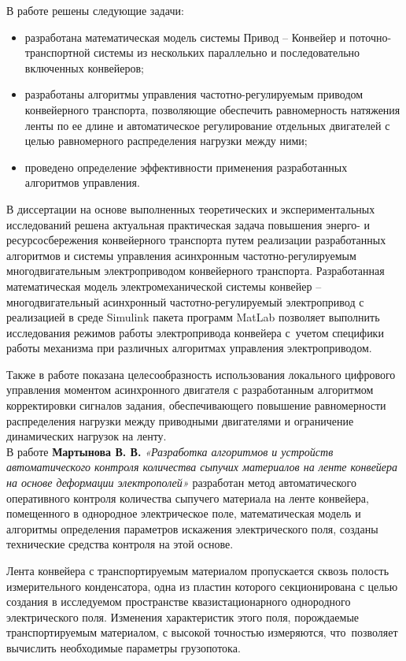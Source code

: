 В работе решены следующие задачи:
\begin{itemize}
\item разработана математическая модель системы Привод – Конвейер  и поточно-транспортной системы из нескольких параллельно и последовательно включенных конвейеров;
\item разработаны алгоритмы управления частотно-регулируемым приводом конвейерного транспорта, позволяющие обеспечить равномерность натяжения ленты по ее длине и автоматическое регулирование отдельных двигателей с целью равномерного распределения нагрузки между ними;
\item проведено определение эффективности применения разработанных алгоритмов управления.
\end{itemize}

В диссертации  на основе выполненных теоретических и экспериментальных исследований решена актуальная практическая задача повышения энерго- и ресурсосбережения конвейерного транспорта путем реализации разработанных алгоритмов и системы управления асинхронным частотно-регулируемым многодвигательным электроприводом конвейерного транспорта. Разработанная математическая модель электромеханической системы конвейер – многодвигательный асинхронный частотно-регулируемый электропривод с реализацией в среде Simulink пакета программ MatLab позволяет выполнить исследования режимов работы электропривода конвейера с~учетом специфики работы механизма при различных алгоритмах управления электроприводом.

Также в работе показана целесообразность использования локального цифрового управления моментом асинхронного двигателя с разработанным алгоритмом корректировки сигналов задания, обеспечивающего повышение равномерности распределения нагрузки между приводными двигателями и ограничение динамических нагрузок на ленту.\\

В работе \textbf{Мартынова В. В.} \textit{«Разработка алгоритмов и устройств автоматического контроля количества сыпучих материалов на ленте конвейера на основе деформации электрополей»} \cite{vmartynov} разработан метод автоматического оперативного контроля количества сыпучего материала на ленте конвейера, помещенного в однородное электрическое поле, математическая модель и алгоритмы определения параметров искажения электрического поля, созданы технические средства контроля на этой основе.

Лента конвейера с транспортируемым материалом пропускается сквозь полость измерительного конденсатора, одна из пластин которого секционирована с целью создания в исследуемом пространстве квазистационарного однородного электрического поля. Изменения характеристик этого поля, порождаемые транспортируемым материалом, с высокой точностью измеряются, что~позволяет вычислить необходимые параметры грузопотока. 

